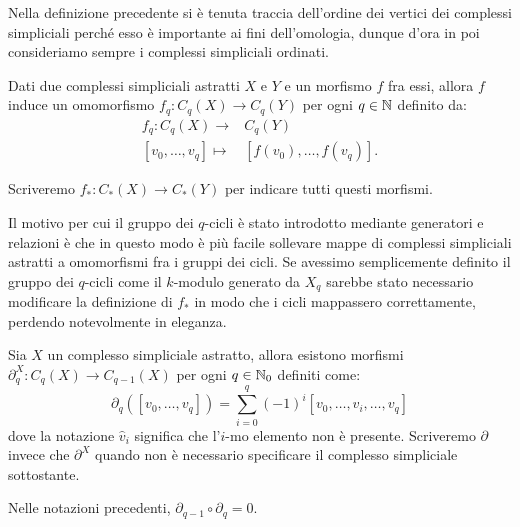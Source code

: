 \begin{rmk}
  Nella definizione precedente si è tenuta traccia dell'ordine dei vertici dei complessi simpliciali perché esso è importante ai fini dell'omologia, dunque d'ora in poi consideriamo sempre i complessi simpliciali ordinati.
\end{rmk}

\begin{lemma}\label{lemma:sollcicli}
  Dati due complessi simpliciali astratti $X$ e $Y$ e un morfismo $f$ fra essi, allora $f$ induce un omomorfismo $f_q:C_q(X)\to C_q(Y)$ per ogni $q\in\mathbb{N}$ definito da:
  \begin{align*}
    f_q:C_q(X)\longrightarrow & C_q(Y)\\
    [v_0,\dots,v_q] \mapsto & [f(v_0),\dots,f(v_q)].
  \end{align*}

  Scriveremo $f_*:C_*(X)\to C_*(Y)$ per indicare tutti questi morfismi.
\end{lemma}

\begin{rmk}
  Il motivo per cui il gruppo dei $q$-cicli è stato introdotto mediante generatori e relazioni è che in questo modo è più facile sollevare mappe di complessi simpliciali astratti a omomorfismi fra i gruppi dei cicli. Se avessimo semplicemente definito il gruppo dei $q$-cicli come il $k$-modulo generato da $X_q$ sarebbe stato necessario modificare la definizione di $f_*$ in modo che i cicli mappassero correttamente, perdendo notevolmente in eleganza.
\end{rmk}

\begin{definition}
  Sia $X$ un complesso simpliciale astratto, allora esistono morfismi $\partial^X_q:C_q(X) \to C_{q-1}(X)$ per ogni $q\in\mathbb{N}_0$ definiti come:
  \begin{equation*}
    \partial_q([v_0,\dots,v_q])=\sum_{i=0}^q (-1)^i[v_0,\dots,\widehat{v}_i,\dots,v_q]
  \end{equation*}
  dove la notazione $\widehat{v}_i$ significa che l'$i$-mo elemento non è presente. Scriveremo $\partial$ invece che $\partial^X$ quando non è necessario specificare il complesso simpliciale sottostante.
\end{definition}

\begin{lemma}
  Nelle notazioni precedenti, $\partial_{q-1}\circ \partial_q=0$.
\end{lemma}

